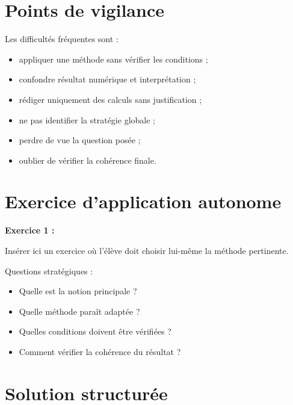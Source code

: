\documentclass[11pt,a4paper]{article}
\begin{document}
\section{Points de vigilance}

\begin{cadreattention}
Les difficultés fréquentes sont :
\begin{itemize}
    \item appliquer une méthode sans vérifier les conditions ;
    \item confondre résultat numérique et interprétation ;
    \item rédiger uniquement des calculs sans justification ;
    \item ne pas identifier la stratégie globale ;
    \item perdre de vue la question posée ;
    \item oublier de vérifier la cohérence finale.
\end{itemize}
\end{cadreattention}

\section{Exercice d’application autonome}

\begin{cadreenonce}
\textbf{Exercice 1 :}

Insérer ici un exercice où l’élève doit choisir lui-même la méthode pertinente.
\end{cadreenonce}

\begin{cadreaide}
Questions stratégiques :
\begin{itemize}
    \item Quelle est la notion principale ?
    \item Quelle méthode paraît adaptée ?
    \item Quelles conditions doivent être vérifiées ?
    \item Comment vérifier la cohérence du résultat ?
\end{itemize}
\end{cadreaide}

\section{Solution structurée}
\end{document}
